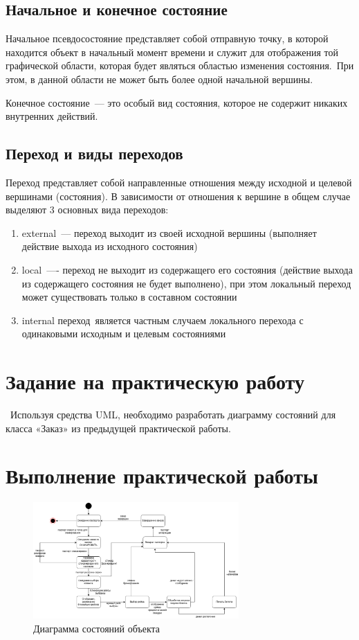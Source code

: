 \subsection{Начальное и конечное состояние}

Начальное псевдосостояние представляет собой отправную точку, в которой находится объект в начальный момент времени и служит для отображения той графической области, которая будет являться областью изменения состояния. При этом, в данной области не может быть более одной начальной вершины.

Конечное состояние --- это особый вид состояния, которое не содержит никаких внутренних действий. 

\subsection{Переход и виды переходов}

Переход представляет собой направленные отношения между исходной и целевой вершинами (состояния). В зависимости от отношения к вершине в общем случае выделяют 3 основных вида переходов:

\begin{enumerate}
	\item{ external --- переход выходит из своей исходной вершины (выполняет действие выхода из исходного состояния)}
	\item{local ---- переход не выходит из содержащего его состояния (действие выхода из содержащего состояния не будет выполнено), при этом локальный переход может существовать только в составном состоянии}
	\item{ internal переход является частным случаем локального перехода с одинаковыми исходным и целевым состояниями}
\end{enumerate}

\section{Задание на практическую работу}

 Используя средства UML, необходимо разработать диаграмму состояний для класса «Заказ» из предыдущей практической работы.

\section{Выполнение практической работы}

\begin{figure}[h!]
        \centering
        \includegraphics[width=0.7\textwidth]{images/6/state.eps}
        \caption{Диаграмма состояний объекта}
        \label{state}
\end{figure}

